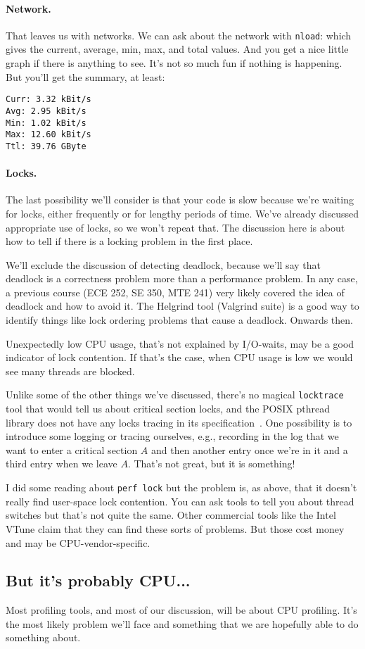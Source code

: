 \paragraph{Network.} That leaves us with networks. We can ask about the network with \texttt{nload}: which gives the current, average, min, max, and total values. And you get a nice little graph if there is anything to see. It's not so much fun if nothing is happening. But you'll get the summary, at least:

\begin{verbatim}
Curr: 3.32 kBit/s
Avg: 2.95 kBit/s
Min: 1.02 kBit/s
Max: 12.60 kBit/s
Ttl: 39.76 GByte                                                                                       \end{verbatim}

\paragraph{Locks.}
The last possibility we'll consider is that your code is slow because we're waiting for locks, either frequently or for lengthy periods of time. We've already discussed appropriate use of locks, so we won't repeat that. The discussion here is about how to tell if there is a locking problem in the first place.

We'll exclude the discussion of detecting deadlock, because we'll say that deadlock is a correctness problem more than a performance problem. In any case, a previous course (ECE 252, SE 350, MTE 241) very likely covered the idea of deadlock and how to avoid it. The Helgrind tool (Valgrind suite) is a good way to identify things like lock ordering problems that cause a deadlock. Onwards then. 

Unexpectedly low CPU usage, that's not explained by I/O-waits, may be a good indicator of lock contention. If that's the case, when CPU usage is low we would see many threads are blocked. 

Unlike some of the other things we've discussed, there's no magical \texttt{locktrace} tool that would tell us about critical section locks, and the POSIX pthread library does not have any locks tracing in its specification~\cite{usd}. One possibility is to introduce some logging or tracing ourselves, e.g., recording in the log that we want to enter a critical section $A$ and then another entry once we're in it and a third entry when we leave $A$. That's not great, but it is something! 

I did some reading about \texttt{perf lock} but the problem is, as above, that it doesn't really find user-space lock contention. You can ask tools to tell you about thread switches but that's not quite the same. Other commercial tools like the Intel VTune claim that they can find these sorts of problems. But those cost money and may be CPU-vendor-specific.


\subsection*{But it's probably CPU...}
Most profiling tools, and most of our discussion, will be about CPU profiling. It's the most likely problem we'll face and something that we are hopefully able to do something about. 




